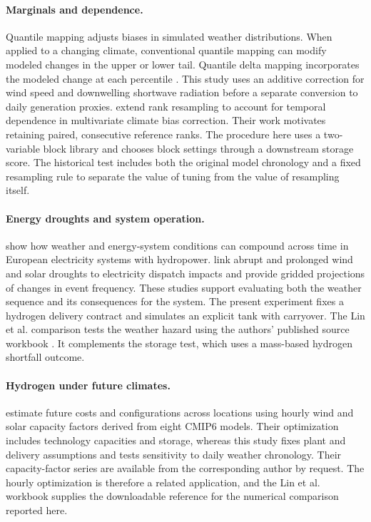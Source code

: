 \documentclass[10pt,a4paper,twocolumn]{article}
\begin{document}
\paragraph{Marginals and dependence.}
Quantile mapping adjusts biases in simulated weather distributions. When applied to a changing climate, conventional quantile mapping can modify modeled changes in the upper or lower tail. Quantile delta mapping incorporates the modeled change at each percentile \citep{cannon2015}. This study uses an additive correction for wind speed and downwelling shortwave radiation before a separate conversion to daily generation proxies. \citet{vrac2020} extend rank resampling to account for temporal dependence in multivariate climate bias correction. Their work motivates retaining paired, consecutive reference ranks. The procedure here uses a two-variable block library and chooses block settings through a downstream storage score. The historical test includes both the original model chronology and a fixed resampling rule to separate the value of tuning from the value of resampling itself.

\paragraph{Energy droughts and system operation.}
\citet{vandermost2024} show how weather and energy-system conditions can compound across time in European electricity systems with hydropower. \citet{lin2026} link abrupt and prolonged wind and solar droughts to electricity dispatch impacts and provide gridded projections of changes in event frequency. These studies support evaluating both the weather sequence and its consequences for the system. The present experiment fixes a hydrogen delivery contract and simulates an explicit tank with carryover. The Lin et al. comparison tests the weather hazard using the authors' published source workbook \citep{lin2026data}. It complements the storage test, which uses a mass-based hydrogen shortfall outcome.

\paragraph{Hydrogen under future climates.}
\citet{wu2026} estimate future costs and configurations across locations using hourly wind and solar capacity factors derived from eight CMIP6 models. Their optimization includes technology capacities and storage, whereas this study fixes plant and delivery assumptions and tests sensitivity to daily weather chronology. Their capacity-factor series are available from the corresponding author by request. The hourly optimization is therefore a related application, and the Lin et al. workbook supplies the downloadable reference for the numerical comparison reported here.
\end{document}
